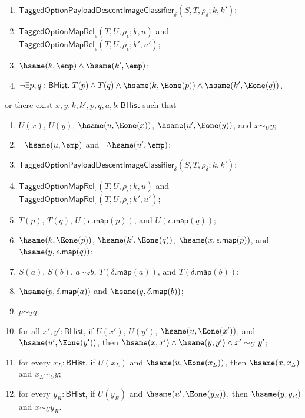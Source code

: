 \begin{theorem}
\begin{enumerate}
\begin{enumerate}
\item $\mathsf{TaggedOptionPayloadDescentImageClassifier}_{\delta}
(S,T,\rho_{\delta};k,k')$;
\item $\mathsf{TaggedOptionMapRel}_{\epsilon}(T,U,\rho_{\epsilon};k,u)$ and
$\mathsf{TaggedOptionMapRel}_{\epsilon}(T,U,\rho_{\epsilon};k',u')$;
\item $\hsame(k,\emp)\land \hsame(k',\emp)$;
\item $\neg\exists p,q:\mathsf{BHist}.\;
T(p)\land T(q)\land
\hsame(k,\Eone(p))\land
\hsame(k',\Eone(q))$.
\end{enumerate}
\end{enumerate}
or there exist $x,y,k,k',p,q,a,b:\mathsf{BHist}$ such that
\begin{enumerate}
\item $U(x)$, $U(y)$, $\hsame(u,\Eone(x))$, $\hsame(u',\Eone(y))$, and
$x\sim_U y$;
\item $\neg\hsame(u,\emp)$ and $\neg\hsame(u',\emp)$;
\item $\mathsf{TaggedOptionPayloadDescentImageClassifier}_{\delta}
(S,T,\rho_{\delta};k,k')$;
\item $\mathsf{TaggedOptionMapRel}_{\epsilon}(T,U,\rho_{\epsilon};k,u)$ and
$\mathsf{TaggedOptionMapRel}_{\epsilon}(T,U,\rho_{\epsilon};k',u')$;
\item $T(p)$, $T(q)$, $U(\epsilon.\mathsf{map}(p))$, and
$U(\epsilon.\mathsf{map}(q))$;
\item $\hsame(k,\Eone(p))$, $\hsame(k',\Eone(q))$,
$\hsame(x,\epsilon.\mathsf{map}(p))$, and
$\hsame(y,\epsilon.\mathsf{map}(q))$;
\item $S(a)$, $S(b)$, $a\sim_S b$, $T(\delta.\mathsf{map}(a))$, and
$T(\delta.\mathsf{map}(b))$;
\item $\hsame(p,\delta.\mathsf{map}(a))$ and
$\hsame(q,\delta.\mathsf{map}(b))$;
\item $p\sim_T q$;
\item for all $x',y':\mathsf{BHist}$, if $U(x')$, $U(y')$,
$\hsame(u,\Eone(x'))$, and $\hsame(u',\Eone(y'))$, then
$\hsame(x,x')\land \hsame(y,y')\land x'\sim_U y'$;
\item for every $x_L:\mathsf{BHist}$, if $U(x_L)$ and
$\hsame(u,\Eone(x_L))$, then $\hsame(x,x_L)$ and $x_L\sim_U y$;
\item for every $y_R:\mathsf{BHist}$, if $U(y_R)$ and
$\hsame(u',\Eone(y_R))$, then $\hsame(y,y_R)$ and $x\sim_U y_R$.
\end{enumerate}
\end{theorem}
